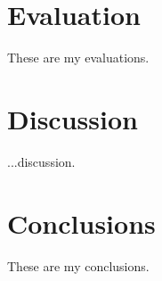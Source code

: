 \documentclass[pdftex,english,oribibl]{llncs}
\begin{document}
\section{Evaluation}\label{sec:evaluation}

  These are my evaluations.
  
\section{Discussion}\label{sec:discussion}

  ...discussion.

\section{Conclusions}\label{sec:conclusions}

  These are my conclusions.
  

\end{document}
